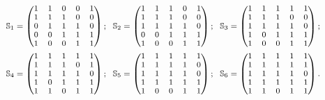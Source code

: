\documentclass[10pt,a4paper]{amsart}
\begin{document}
\begin{align}
{\fontsize{8}{9}\selectfont
\begin{aligned}
\mathbb{S}_1 = 
\begin{pmatrix}
        1 & 1 & 0 & 0 & 1 \\
        1 & 1 & 1 & 0 & 0 \\
        0 & 1 & 1 & 1 & 0 \\
        0 & 0 & 1 & 1 & 1 \\
        1 & 0 & 0 & 1 & 1
\end{pmatrix};~~
\mathbb{S}_2 = 
\begin{pmatrix}
        1 & 1 & 1 & 0 & 1 \\
        1 & 1 & 1 & 0 & 0 \\
        1 & 1 & 1 & 1 & 0 \\
        0 & 0 & 1 & 1 & 1 \\
        1 & 0 & 0 & 1 & 1
\end{pmatrix};~~
\mathbb{S}_3= 
\begin{pmatrix}
        1 & 1 & 1 & 1 & 1 \\
        1 & 1 & 1 & 0 & 0 \\
        1 & 1 & 1 & 1 & 0 \\
        1 & 0 & 1 & 1 & 1 \\
        1 & 0 & 0 & 1 & 1
\end{pmatrix};\\
\mathbb{S}_4 = 
\begin{pmatrix}
        1 & 1 & 1 & 1 & 1 \\
        1 & 1 & 1 & 0 & 1 \\
        1 & 1 & 1 & 1 & 0 \\
        1 & 0 & 1 & 1 & 1 \\
        1 & 1 & 0 & 1 & 1
\end{pmatrix};~~
\mathbb{S}_5 = 
\begin{pmatrix}
        1 & 1 & 1 & 1 & 1 \\
        1 & 1 & 1 & 1 & 0 \\
        1 & 1 & 1 & 1 & 0 \\
        1 & 1 & 1 & 1 & 1 \\
        1 & 0 & 0 & 1 & 1
\end{pmatrix};~~
\mathbb{S}_6= 
\begin{pmatrix}
        1 & 1 & 1 & 1 & 1 \\
        1 & 1 & 1 & 1 & 1 \\
        1 & 1 & 1 & 1 & 0 \\
        1 & 1 & 1 & 1 & 1 \\
        1 & 1 & 0 & 1 & 1
\end{pmatrix}.
\end{aligned}}\label{penta}
\end{align}
\end{document}
